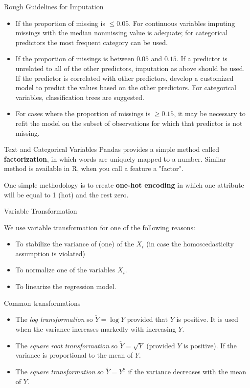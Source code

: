 \documentclass{beamer}
\begin{document}
\begin{frame}{Rough Guidelines for Imputation}
	\begin{itemize}
		\item If the proportion of missing is $\le 0.05$. For continuous variables imputing missings with the median nonmissing value is adequate; for categorical predictors the most frequent category can be used.
		\item If the proportion of missings is between $0.05$ and $0.15$. If a predictor is unrelated to all of the other predictors, imputation as above should be used. If the predictor is correlated with other predictors, develop a customized model to predict the values based on the other predictors. For categorical variables, classification trees are suggested.
		\item For cases where the proportion of missings is $\ge 0.15$, it may be necessary to refit the model on the subset of observations for which that predictor is not missing. 
	\end{itemize}
\end{frame}

\begin{frame}{Text and Categorical Variables}
	Pandas provides a simple method called {\bf factorization}, in which words are uniquely mapped to a number. Similar method is available in R, when you call a feature a "factor".
	
	One simple methodology is to create {\bf one-hot encoding} in which one attribute will be equal to 1 (hot) and the rest zero.  
\end{frame}

\begin{frame}{Variable Transformation}
	
	We use variable transformation for one of the following reasons:
	
	\begin{itemize}
		\item To stabilize the variance of (one) of the $X_i$ (in case the homoscedasticity assumption is violated)
		\item To normalize one of the variables $X_i$.
		\item To linearize the regression model. 
	\end{itemize}


\end{frame}

\begin{frame}{Common transformations}
	\begin{itemize}
		\item The {\it log transformation} so $\tilde{Y}= \log Y$ provided that $Y$ is positive. It is used when the variance increases markedly with increasing $Y$.
		\item The {\it square root transformation} so $\tilde{Y}= \sqrt{Y}$ (provided $Y$ is positive). If the variance is proportional to the mean of $Y$.
		\item The {\it square transformation} so $\tilde{Y}= Y^2$ if the variance decreases with the mean of $Y$.
	\end{itemize}
\end{frame}
\end{document}
